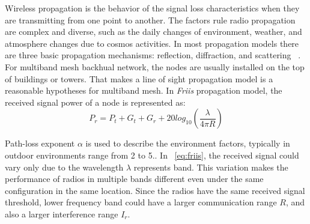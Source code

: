 Wireless propagation is the behavior of the signal loss characteristics when they are transmitting from one point to another.
The factors rule radio propagation are complex and diverse, 
such as the daily changes of environment, weather, and atmosphere changes due to cosmos activities. 
In most propagation models there are three basic propagation mechanisms: reflection, diffraction, and scattering ~\cite{andersen1995propagation}.
For multiband mesh backhual network, the nodes are usually installed on the top of buildings or towers. That makes a line of sight propagation model is a reasonable hypotheses for multiband mesh.
In \emph{Friis} propagation model, the received signal power of a node is represented as: 
\begin{equation}
\label{eq:friis}
P_r=P_t+G_t+G_r+20log_{10}(\frac{\lambda}{4\pi R})
\end{equation}

Path-loss exponent \emph{$\alpha$} is used to describe the environment factors, typically in outdoor environments range from 2 to 5.\cite{camp2006measurement}. 
In ~\ref{eq:friis}, the received signal could vary only due to the wavelength $\lambda$ represents band. 
This variation makes the performance of radios in multiple bands different even under the same configuration in the same location. Since the radios have the same received signal threshold, lower frequency band could have a larger communication range $R$, and also a larger interference range $I_r$.


